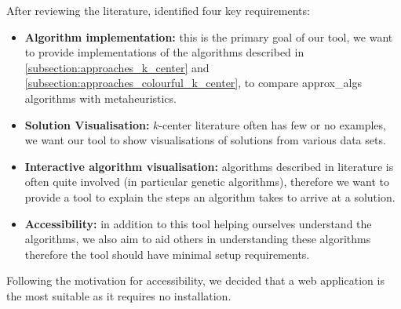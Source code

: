 After reviewing the literature, identified four key requirements:
\begin{itemize}
    \item \textbf{Algorithm implementation:} this is the primary goal of our tool, we want to provide implementations of the algorithms described in \cref{subsection:approaches_k_center} and \cref{subsection:approaches_colourful_k_center}, to compare \gls{approx_algs} algorithms with \glspl{metaheuristic}.
    \item  \textbf{Solution Visualisation:} $k$-center literature often has few or no examples, we want our tool to show visualisations of solutions from various data sets.
    \item  \textbf{Interactive algorithm visualisation:} algorithms described in literature is often quite involved (in particular genetic algorithms), therefore we want to provide a tool to explain the steps an algorithm takes to arrive at a solution.
    \item  \textbf{Accessibility:} in addition to this tool helping ourselves understand the algorithms, we also aim to aid others in understanding these algorithms therefore the tool should have minimal setup requirements.
\end{itemize}

Following the motivation for accessibility, we decided that a web application is the most suitable as it requires no installation.